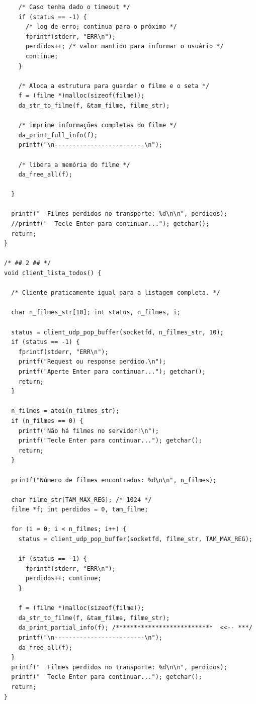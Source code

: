 \documentclass[11pt,twoside]{article}
\begin{document}
\begin{verbatim}
    /* Caso tenha dado o timeout */
    if (status == -1) {
      /* log de erro; continua para o próximo */
      fprintf(stderr, "ERR\n");
      perdidos++; /* valor mantido para informar o usuário */
      continue;
    }
    
    /* Aloca a estrutura para guardar o filme e o seta */
    f = (filme *)malloc(sizeof(filme));
    da_str_to_filme(f, &tam_filme, filme_str);
    
    /* imprime informações completas do filme */
    da_print_full_info(f);
    printf("\n-------------------------\n");

    /* libera a memória do filme */
    da_free_all(f);
    
  }

  printf("  Filmes perdidos no transporte: %d\n\n", perdidos);
  //printf("  Tecle Enter para continuar..."); getchar();
  return;
}

/* ## 2 ## */
void client_lista_todos() {

  /* Cliente praticamente igual para a listagem completa. */
  
  char n_filmes_str[10]; int status, n_filmes, i;
 
  status = client_udp_pop_buffer(socketfd, n_filmes_str, 10);
  if (status == -1) {
    fprintf(stderr, "ERR\n");
    printf("Request ou response perdido.\n");
    printf("Aperte Enter para continuar..."); getchar();
    return;
  }

  n_filmes = atoi(n_filmes_str);
  if (n_filmes == 0) {
    printf("Não há filmes no servidor!\n");
    printf("Tecle Enter para continuar..."); getchar();
    return;
  }

  printf("Número de filmes encontrados: %d\n\n", n_filmes);

  char filme_str[TAM_MAX_REG]; /* 1024 */
  filme *f; int perdidos = 0, tam_filme;
  
  for (i = 0; i < n_filmes; i++) {
    status = client_udp_pop_buffer(socketfd, filme_str, TAM_MAX_REG);

    if (status == -1) { 
      fprintf(stderr, "ERR\n");
      perdidos++; continue;
    }
    
    f = (filme *)malloc(sizeof(filme));
    da_str_to_filme(f, &tam_filme, filme_str);
    da_print_partial_info(f); /***************************  <<-- ***/
    printf("\n-------------------------\n");
    da_free_all(f);
  }
  printf("  Filmes perdidos no transporte: %d\n\n", perdidos);
  printf("  Tecle Enter para continuar..."); getchar();
  return;
}


\end{verbatim}
\end{document}
